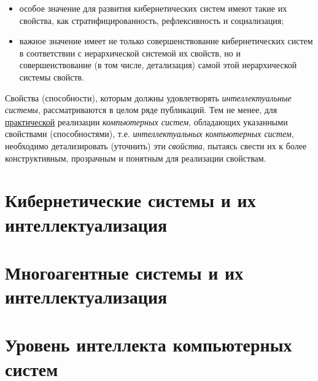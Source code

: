 {\begin{itemize}
	систем, а также для сравнения различных альтернативных предположений;
	\item особое значение для развития кибернетических систем имеют такие их свойства, как стратифицированность,
	рефлексивность и социализация;
	\item важное значение имеет не только совершенствование кибернетических систем в соответствии с иерархической
	системой их свойств, но и совершенствование (в том числе, детализация) самой этой иерархической системы свойств.
\end{itemize}
Свойства (способности), которым должны удовлетворять \textit{интеллектуальные системы}, рассматриваются в целом ряде
	публикаций. Тем не менее, для \uline{практической} реализации \textit{компьютерных систем}, обладающих указанными
	свойствами (способностями), т.е. \textit{интеллектуальных компьютерных систем}, необходимо детализировать
	(уточнить) эти \textit{свойства}, пытаясь свести их к более конструктивным, прозрачным и понятным для реализации
	свойствам.
}

\section{Кибернетические системы и их интеллектуализация}



\section{Многоагентные системы и их интеллектуализация}
\label{section_mas}

\section{Уровень интеллекта компьютерных систем}

%